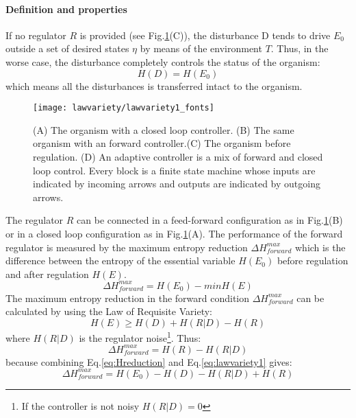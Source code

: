 \paragraph{Definition and properties}
If no regulator $R$ is provided (see Fig.\ref{fig:ashby1}(C)), the disturbance D
tends to drive $E_0$ outside a set of desired states $\eta$ by means of the
environment $T$.
Thus, in the worse case, the disturbance completely controls the status of the organism:
\begin{equation}
H(D)=H(E_0)\label{eq:initial}
\end{equation}
which means all the disturbances is transferred intact to the organism.
\begin{figure}
\begin{center}
\texttt{[image: lawvariety/lawvariety1\_fonts]}
\caption[Law of requisite variety for learning and non learning agents]{(A)
The organism with a closed loop controller. (B) The same organism with an forward
controller.(C) The organism before regulation. (D) An adaptive controller is a
 mix of forward and closed loop control. Every block is a finite state machine
whose inputs are indicated by incoming arrows and outputs are indicated by
outgoing arrows. \label{fig:ashby1}}
\end{center}
\end{figure}
The regulator $R$ can be connected in a feed-forward configuration as in
Fig.\ref{fig:ashby1}(B) or in a closed loop configuration as in Fig.\ref{fig:ashby1}(A).
The performance of the forward regulator is measured by the maximum entropy
reduction $\Delta H^{max}_{forward}$ which is the difference between the entropy
of the essential variable $H(E_0)$ before regulation and after regulation $H(E)$.
\begin{equation}
\Delta H^{max}_{forward}=H(E_0)-min H(E)\label{eq:Hreduction}
\end{equation}
The maximum entropy reduction in the forward condition $\Delta H^{max}_{forward}$
 can be calculated by using the Law of Requisite Variety:
\begin{equation}
H(E)\geq H(D)+H(R|D)-H(R)\label{eq:lawvariety1}
\end{equation}
where $H(R|D)$ is the regulator noise\footnote{If the controller is not noisy $H(R|D)=0$}.
Thus:
\begin{equation}
\Delta H^{max}_{forward}=H(R)-H(R|D)\label{eq.deltaforward}
\end{equation}
because combining Eq.\ref{eq:Hreduction} and Eq.\ref{eq:lawvariety1} gives:
\begin{equation}
\Delta H^{max}_{forward}=H(E_0)-H(D)-H(R|D)+H(R)
\end{equation}
